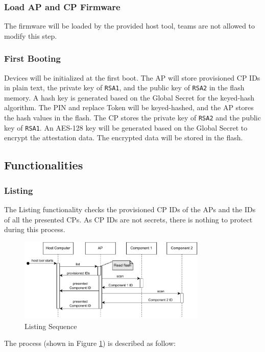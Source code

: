 \documentclass[11pt,oneside,onecolumn,letterpaper]{article}
\newcounter{alg}
\begin{document}
	\subsubsection{Load AP and CP Firmware}
	The firmware will be loaded by the provided host tool,
	teams are not allowed to modify this step.
	
	\subsubsection{First Booting}
	Devices will be initialized at the first boot.
	The AP will store provisioned CP IDs in plain text,
	the private key of \texttt{RSA1},
	and the public key of \texttt{RSA2} in the flash memory.
	A hash key is generated based on the Global Secret for the keyed-hash algorithm.
	The PIN and replace Token will be keyed-hashed,
	and the AP stores the hash values in the flash.
	The CP stores the private key of \texttt{RSA2} and the public key of \texttt{RSA1}.
	An AES-128 key will be generated based on the Global Secret to encrypt the attestation data.
	The encrypted data will be stored in the flash.
	
	\subsection{Functionalities}
	\subsubsection{Listing}
	The Listing functionality checks the provisioned CP IDs of the APs and the IDs of all the presented CPs.
	As CP IDs are not secrets,
	there is nothing to protect during this process.
	
	\begin{figure}[h]
		\centering
		\includegraphics[width=0.8\textwidth]{pics/list.pdf}
		\caption{Listing Sequence}
		\label{fig:functionality_list}
	\end{figure}
	
	The process (shown in Figure \ref{fig:functionality_list}) is described as follow:
	
\end{document}
